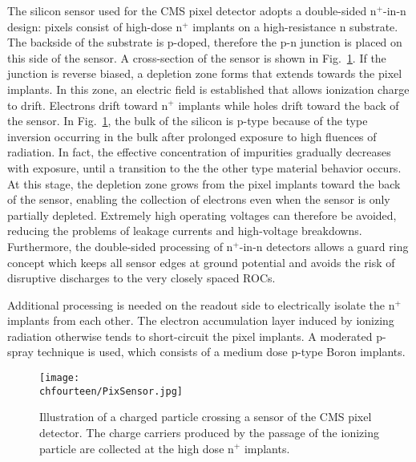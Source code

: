 The silicon sensor used for the CMS pixel detector adopts a double-sided n$^+$-in-n design: pixels consist of high-dose n$^+$ implants on a high-resistance n substrate.
The backside of the substrate is p-doped, therefore the p-n junction is placed on this side of the sensor. A cross-section of the sensor is shown in Fig.~\ref{fig:PixSensor}.
If the junction is reverse biased, a depletion zone forms that extends towards the pixel implants. In this zone, an electric field is established that allows ionization charge to drift.
Electrons drift toward n$^+$ implants while holes drift toward the back of the sensor.
In Fig.~\ref{fig:PixSensor}, the bulk of the silicon is p-type because of the type inversion occurring in the bulk after prolonged exposure to high fluences of radiation.
In fact, the effective concentration of impurities gradually decreases with exposure, until a transition to the the other type material behavior occurs.
At this stage, the depletion zone grows from the pixel implants toward the back of the sensor, enabling the collection of electrons even when the sensor is only partially depleted.
Extremely high operating voltages can therefore be avoided, reducing the problems of leakage currents and high-voltage breakdowns.
Furthermore, the double-sided processing of n$^+$-in-n detectors allows a guard ring concept which keeps all sensor edges at ground potential
and avoids the risk of disruptive discharges to the very closely spaced ROCs.

Additional processing is needed on the readout side to electrically isolate the n$^+$ implants from each other.
The electron accumulation layer induced by ionizing radiation otherwise tends to short-circuit the pixel implants.
A moderated p-spray technique is used, which consists of a medium dose p-type Boron implants.\\

\begin{figure}[!htb]
 \begin{center}
 \texttt{[image: \\chfourteen/PixSensor.jpg]}
 \end{center}
 \caption{Illustration of a charged particle crossing a sensor of the CMS pixel detector. The charge carriers produced by the passage of the ionizing particle are collected at the high dose n$^+$ implants.}
 \label{fig:PixSensor}
\end{figure}


